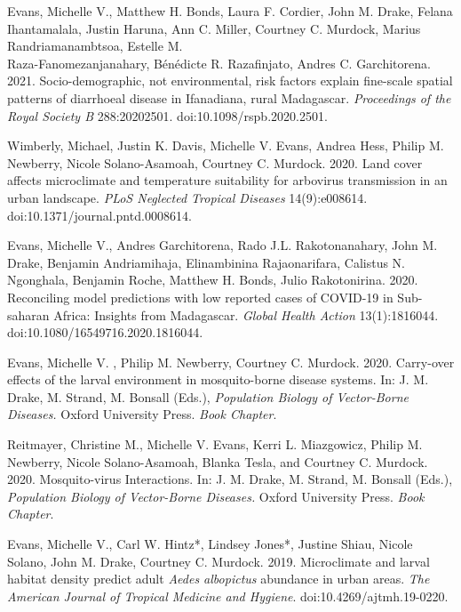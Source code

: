 \begin{etaremune}
\item \textcolor{awesome}{Evans, Michelle V.}, Matthew H. Bonds, Laura F. Cordier, John M. Drake, Felana Ihantamalala, Justin Haruna, Ann C. Miller, Courtney C. Murdock, Marius Randriamanambtsoa, Estelle M. \\ Raza-Fanomezanjanahary, Bénédicte R. Razafinjato, Andres C. Garchitorena. 2021. Socio-demographic, not environmental, risk factors explain fine-scale spatial patterns of diarrhoeal disease in Ifanadiana, rural Madagascar. \textit{Proceedings of the Royal Society B} 288:20202501. doi:10.1098/rspb.2020.2501. \smallskip

\item Wimberly, Michael, Justin K. Davis, \textcolor{awesome}{Michelle V. Evans}, Andrea Hess, Philip M. Newberry, Nicole Solano-Asamoah, Courtney C. Murdock. 2020. Land cover affects microclimate and temperature suitability for arbovirus transmission in an urban landscape. \textit{PLoS Neglected Tropical Diseases} 14(9):e008614. doi:10.1371/journal.pntd.0008614. \smallskip

\item \textcolor{awesome}{Evans, Michelle V.}, Andres Garchitorena, Rado J.L. Rakotonanahary, John M. Drake, Benjamin Andriamihaja, Elinambinina Rajaonarifara, Calistus N. Ngonghala, Benjamin Roche, Matthew H. Bonds, Julio Rakotonirina. 2020. Reconciling model predictions with low reported cases of COVID-19 in Sub-saharan Africa: Insights from Madagascar. \textit{Global Health Action} 13(1):1816044. \\doi:10.1080/16549716.2020.1816044. \smallskip

\item \textcolor{awesome}{Evans, Michelle V. }, Philip M. Newberry, Courtney C. Murdock. 2020. Carry-over effects of the larval environment in mosquito-borne disease systems. In: J. M. Drake, M. Strand, M. Bonsall (Eds.), \textit{Population Biology of Vector-Borne Diseases.} Oxford University Press. \textit{Book Chapter}.\smallskip

\item Reitmayer, Christine M., \textcolor{awesome}{Michelle V. Evans}, Kerri L. Miazgowicz, Philip M. Newberry, Nicole Solano-Asamoah, Blanka Tesla, and Courtney C. Murdock. 2020. Mosquito-virus Interactions. In: J. M. Drake, M. Strand, M. Bonsall (Eds.), \textit{Population Biology of Vector-Borne Diseases.} Oxford University Press. \textit{Book Chapter}. \smallskip

\item \textcolor{awesome}{Evans, Michelle V.}, Carl W. Hintz*, Lindsey Jones*, Justine Shiau, Nicole Solano, John M. Drake, Courtney C. Murdock. 2019. Microclimate and larval habitat density predict adult \textit{Aedes albopictus} abundance in urban areas. \textit{The American Journal of Tropical Medicine and Hygiene}. doi:10.4269/ajtmh.19-0220. \smallskip


\end{etaremune}
